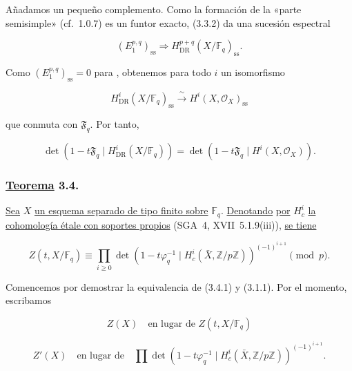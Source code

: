 Añadamos un pequeño complemento. Como la formación de la «parte
semisimple» (cf.~1.0.7) es un funtor exacto, (3.3.2) da una sucesión
espectral

\begin{equation}\tag{3.3.3}
(E_1^{p,q})_{\mathrm{ss}}
\Longrightarrow H^{p+q}_{\mathrm{DR}}(X/\mathbb F_q)_{\mathrm{ss}}.
\end{equation}

Como $(E_1^{p,q})_{\mathrm{ss}}=0$ para
, obtenemos para todo $i$ un isomorfismo

\begin{equation}\tag{3.3.4}
H^i_{\mathrm{DR}}(X/\mathbb F_q)_{\mathrm{ss}}
\xrightarrow{\ \sim\ }
H^i(X,\mathcal O_X)_{\mathrm{ss}}
\end{equation}

que conmuta con $\mathfrak F_q$. Por tanto,

\begin{equation}\tag{3.3.5}
\det\!\left(1-t\mathfrak F_q\mid H^i_{\mathrm{DR}}(X/\mathbb F_q)\right)
=
\det\!\left(1-t\mathfrak F_q\mid H^i(X,\mathcal O_X)\right).
\end{equation}

\pageoriginale

\subsubsection*{\underline{Teorema} 3.4.}
\underline{Sea} $X$ \underline{un esquema separado de tipo finito sobre} $\mathbb F_q$. \underline{Denotando}
\underline{por} $H_c^i$ \underline{la cohomología étale con soportes propios} (SGA~4,
XVII~5.1.9(iii)), \underline{se tiene}

\begin{equation}\tag{3.4.1}
Z(t,X/\mathbb F_q)
\equiv
\prod_{i\geq0}
\det\!\left(1-t\varphi_q^{-1}\mid
H_c^i(\bar X,\mathbb Z/p\mathbb Z)\right)^{(-1)^{i+1}}
\pmod p.
\end{equation}

Comencemos por demostrar la equivalencia de (3.4.1) y (3.1.1). Por el
momento, escribamos

\begin{equation}\tag{3.4.2}
Z(X)\quad\text{en lugar de }Z(t,X/\mathbb F_q)
\end{equation}

\begin{equation}\tag{3.4.3}
Z'(X)\quad\text{en lugar de}\quad
\prod\det\!\left(1-t\varphi_q^{-1}\mid
H_c^i(\bar X,\mathbb Z/p\mathbb Z)\right)^{(-1)^{i+1}}.
\end{equation}

